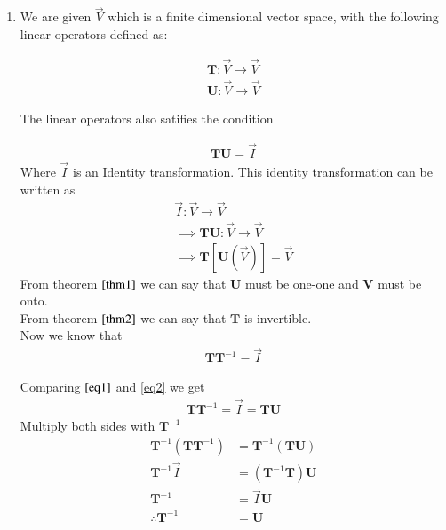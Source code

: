 \documentclass[journal,12pt,twocolumn]{IEEEtran}
\begin{document}
	\begin{enumerate}
		\item We are given $\vec{V}$ which is a finite dimensional vector space, with the following linear operators defined as:-
		
		\begin{align}
			\mathbf{T} : \vec{V} \xrightarrow{} \vec{V} \\
			\mathbf{U} : \vec{V} \xrightarrow{} \vec{V}
		\end{align}
		
		The linear operators also satifies the condition
		
		\begin{align}
			\mathbf{T}\mathbf{U} = \vec{I} \label{eq1}
		\end{align}
		Where $\vec{I}$ is an Identity transformation. This identity transformation can be written as 
		\begin{align}
			\vec{I} : \vec{V} \xrightarrow{} \vec{V} \\
			\implies \mathbf{TU} : \vec{V} \xrightarrow{} \vec{V}\\
			\implies \mathbf{T}\left[ \mathbf{U}\left(\vec{V}\right)\right] = \vec{V}
		\end{align}
		From theorem $\eqref{thm1}$ we can say that $\mathbf{U}$ must be one-one and $\mathbf{V}$ must be onto.\\
		From theorem $\eqref{thm2}$ we can say that $\mathbf{T}$ is invertible.\\
		
		Now we know that
		\begin{align}
			\mathbf{T}\mathbf{T}^{-1} = \vec{I} \label{eq2}
		\end{align}
		
		Comparing $\eqref{eq1}$ and \eqref{eq2} we get
		\begin{align}
			\mathbf{T}\mathbf{T}^{-1} = \vec{I} = \mathbf{T}\mathbf{U}
		\end{align}
		Multiply both sides with $\mathbf{T}^{-1}$
		\begin{align}
			\mathbf{T}^{-1}\left(\mathbf{T}\mathbf{T}^{-1}\right) &= \mathbf{T}^{-1}\left(\mathbf{T}\mathbf{U}\right) \\
			\mathbf{T}^{-1}\vec{I} &= \left(\mathbf{T}^{-1}\mathbf{T}\right)\mathbf{U} \\
			\mathbf{T}^{-1} &= \vec{I}\mathbf{U}\\
			\therefore \mathbf{T}^{-1} &= \mathbf{U}
		\end{align}
		

\end{enumerate}
\end{document}
